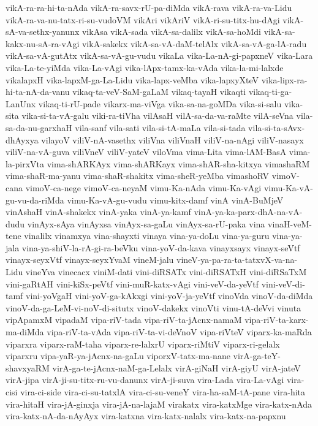 {vikA-ra-ra-hi-ta-nAda
vikA-ra-savx-rU-pa-diMda
vikA-rava
vikA-ra-va-Lidu
vikA-ra-va-nu-tatx-ri-su-vudoVM
vikAri
vikAriV
vikA-ri-su-titx-hu-dAgi
vikA-sA-va-sethx-yanunx
vikAsa
vikA-sada
vikA-sa-dalilx
vikA-sa-hoMdi
vikA-sa-kakx-nu-sA-ra-vAgi
vikA-sakekx
vikA-sa-vA-daM-telAlx
vikA-sa-vA-ga-lA-radu
vikA-sa-vA-gutAtx
vikA-sa-vA-gu-vudu
vikaLa
vika-La-nA-gi-papxneV
vika-Lara
vika-La-te-yiMda
vika-La-vAgi
vika-lApx-tamx-ka-vAda
vika-la-mi-lalxde
vikalapxH
vika-lapxM-ga-La-Lidu
vika-lapx-veMba
vika-lapxyXteV
vika-lipx-ra-hi-ta-nA-da-vanu
vikaq-ta-veV-SaM-gaLaM
vikaq-tayaH
vikaqti
vikaq-ti-ga-LanUnx
vikaq-ti-rU-pade
vikarx-ma-viVga
vika-sa-na-goMDa
vika-si-salu
vika-sita
vika-si-ta-vA-galu
viki-ra-tiVha
vilAsaH
vilA-sa-da-va-raMte
vilA-seVna
vila-sa-da-nu-garxhaH
vila-sanf
vila-sati
vila-si-tA-maLa
vila-si-tada
vila-si-ta-sAvx-dhAyxya
vilayoV
viliV-nA-vasethx
viliVna
viliVnaH
viliV-na-nAgi
viliV-nasayx
viliV-na-vA-guva
viliVneV
viliV-yateV
viloVma
vima-Lita
vima-lAM-BasA
vima-la-pirxVta
vima-shARKAyx
vima-shARKayx
vima-shAR-sha-kitxya
vimashaRM
vima-shaR-ma-yanu
vima-shaR-shakitx
vima-sheR-yeMba
vimashoRV
vimoV-cana
vimoV-ca-nege
vimoV-ca-neyaM
vimu-Ka-nAda
vimu-Ka-vAgi
vimu-Ka-vA-gu-vu-da-riMda
vimu-Ka-vA-gu-vudu
vimu-kitx-damf
vinA
vinA-BuMjeV
vinAshaH
vinA-shakekx
vinA-yaka
vinA-ya-kamf
vinA-ya-ka-parx-dhA-na-vA-dudu
vinAyx-sAya
vinAyxsa
vinAyx-sa-gaLu
vinAyx-sa-rU-paka
vina
vinaH-veM-tene
vinalilx
vinamxya
vina-shayxti
vinaya
vina-ya-doLu
vina-ya-guru
vina-ya-jala
vina-ya-shiV-la-rA-gi-ra-beVku
vina-yoV-da-kava
vinayxsayx
vinayx-seVtf
vinayx-seyxVtf
vinayx-seyxYvaM
vineM-jalu
vineV-ya-pa-ra-ta-tatxvX-va-na-Lidu
vineYva
vinecacx
viniM-dati
vini-diRSATx
vini-diRSATxH
vini-diRSaTxM
vini-gaRtAH
vini-kiSx-peVtf
vini-muR-katx-vAgi
vini-veV-da-yeVtf
vini-veV-di-tamf
vini-yoVgaH
vini-yoV-ga-kAkxgi
vini-yoV-ja-yeVtf
vinoVda
vinoV-da-diMda
vinoV-da-ga-LeM-vi-noV-di-situtx
vinoV-dakekx
vinoVti
vinu-tA-deVvi
vinuta
vipApamxM
vipadaM
vipa-riV-tada
vipa-riV-ta-jAcnx-namaM
vipa-riV-ta-karx-ma-diMda
vipa-riV-ta-vAda
vipa-riV-ta-vi-deVnoV
vipa-riVteV
viparx-ka-maRda
viparxra
viparx-raM-taha
viparx-re-lalxrU
viparx-riMtiV
viparx-ri-gelalx
viparxru
vipa-yaR-ya-jAcnx-na-gaLu
viporxV-tatx-ma-nane
virA-ga-teY-shavxyaRM
virA-ga-te-jAcnx-naM-ga-Lelalx
virA-giNaH
virA-giyU
virA-jateV
virA-jipa
virA-ji-su-titx-ru-vu-danunx
virA-ji-suva
vira-Lada
vira-La-vAgi
vira-cisi
vira-ci-side
vira-ci-su-tatxlA
vira-ci-su-veneY
vira-ha-saM-tA-pane
vira-hita
vira-hitaH
vira-jA-ginxja
vira-jA-na-lajaM
virakatx
vira-katxMge
vira-katx-nAda
vira-katx-nA-da-nAyAyx
vira-katxna
vira-katx-nalalx
vira-katx-na-papxnu
}

